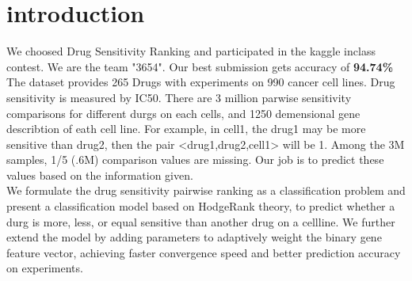 \section{introduction}
We choosed Drug Sensitivity Ranking and participated in the kaggle inclass contest.  We are the team "3654". Our best submission gets accuracy of \textbf{94.74\%}
The dataset provides 265 Drugs with experiments on 990 cancer cell lines. Drug sensitivity is measured by IC50. There are 3 million parwise sensitivity comparisons for different durgs on each cells, and 1250 demensional gene describtion of eath cell line. For example, in cell1, the drug1 may be more sensitive than drug2, then the pair <drug1,drug2,cell1> will be 1. Among the 3M samples, 1/5 (.6M) comparison values are missing. Our job is to predict these values based on the information given. \\
We formulate the drug sensitivity pairwise ranking as a classification problem and present a classification model based on HodgeRank theory, to predict whether a durg is more, less, or equal sensitive than another drug on a cellline. We further extend the model by adding parameters to adaptively weight the binary gene feature vector, achieving faster convergence speed and better prediction accuracy on experiments.
